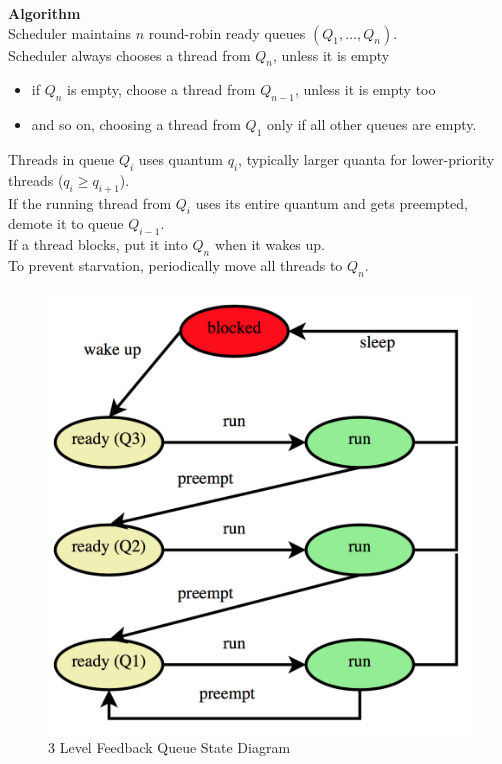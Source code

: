 \documentclass[12pt]{article}
\theoremstyle{plain}
\theoremstyle{definition}
\begin{document}
\textbf{Algorithm} \\
Scheduler maintains $n$ round-robin ready queues $(Q_{1}, \dots, Q_{n})$. \\
Scheduler always chooses a thread from $Q_{n}$, unless it is empty
\begin{itemize}
  \item if $Q_{n}$ is empty, choose a thread from $Q_{n - 1}$, unless it is empty too
  \item and so on, choosing a thread from $Q_{1}$ only if all other queues are empty.
\end{itemize}
Threads in queue $Q_{i}$ uses quantum $q_{i}$, typically larger quanta for lower-priority threads ($q_{i} \geq q_{i + 1}$). \\
If the running thread from $Q_{i}$ uses its entire quantum and gets preempted, demote it to queue $Q_{i - 1}$. \\
If a thread blocks, put it into $Q_{n}$ when it wakes up. \\
To prevent starvation, periodically move all threads to $Q_{n}$.

\begin{figure}[H]
  \centering
  \includegraphics[scale=0.5]{pictures/3-level_queue.png}
  \caption{3 Level Feedback Queue State Diagram}
  \label{fig:3levelfeedback}
\end{figure}
\end{document}
